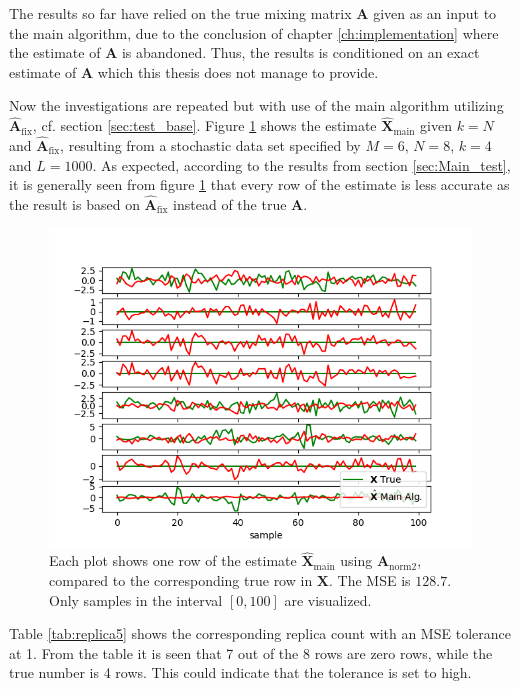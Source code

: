 \noindent
The results so far have relied on the true mixing matrix $\mathbf{A}$ given as an input to the main algorithm, due to the conclusion of chapter \ref{ch:implementation} where the estimate of $\mathbf{A}$ is abandoned. 
Thus, the results is conditioned on an exact estimate of $\mathbf{A}$ which this thesis does not manage to provide.

Now the investigations are repeated but with use of the main algorithm utilizing $\hat{\mathbf{A}}_{\text{fix}}$, cf. section \ref{sec:test_base}.
Figure \ref{fig:ktest5} shows the estimate $\hat{\mathbf{X}}_{\text{main}}$ given $k=N$ and $\hat{\textbf{A}}_{\text{fix}}$, resulting from a stochastic data set specified by $M = 6$, $N = 8$, $k = 4$ and $L = 1000$.
As expected, according to the results from section \ref{sec:Main_test}, it is generally seen from figure \ref{fig:ktest5} that every row of the estimate is less accurate as the result is based on $\hat{\mathbf{A}}_{\text{fix}}$ instead of the true $\mathbf{A}$. 
\begin{figure}[H]
\centering
\includegraphics[scale=0.5]{figures/ch_estimate/k_test5.png}
\caption{Each plot shows one row of the estimate $\hat{\mathbf{X}}_{\text{main}}$ using $\mathbf{A}_{\text{norm2}}$, compared to the corresponding true row in $\mathbf{X}$. The MSE is $128.7$. Only samples in the interval $[0,100]$ are visualized.}
\label{fig:ktest5}
\end{figure}
\noindent
Table \ref{tab:replica5} shows the corresponding replica count with an MSE tolerance at 1. 
From the table it is seen that 7 out of the 8 rows are zero rows, while the true number is 4 rows. 
This could indicate that the tolerance is set to high. 
